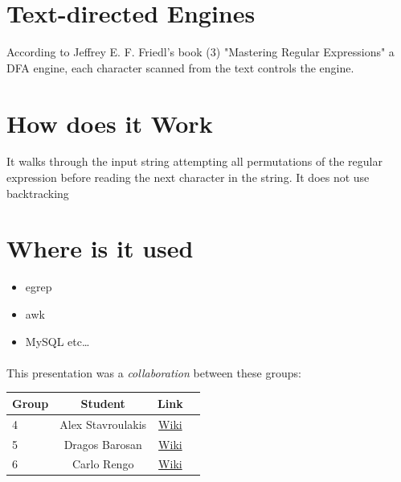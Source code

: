 \documentclass[a4paper,11pt]{report}
\begin{document}
\section{Text-directed Engines}
\begin{center}
According to Jeffrey E. F. Friedl’s book {\footnotesize (3)} "Mastering Regular Expressions" a DFA engine, each character scanned from the text controls the engine.
\end{center}

\section{How does it Work}
\begin{flushright}
It walks through the input string attempting all permutations of the regular expression before reading the next character in the string. It does not use backtracking
\end{flushright}

\section{Where is it used}
\begin{itemize}
  \item egrep
  \item awk
  \item MySQL etc\ldots
\end{itemize}

\paragraph{}
This presentation was a \emph{collaboration} between these groups: \\

\begin{center}
 \begin{tabular}{| l | c | c | c |}
 \hline \textbf{Group} & \textbf{Student} & \textbf{Link} \\
 \hline 
 4 & Alex Stavroulakis & \href{https://www.os3.nl/2014-2015/students/alexandros_stavroulakis/es}{Wiki}\\
 \hline 
 5 & Dragos Barosan & \href{https://www.os3.nl/2014-2015/students/dragos_barosan/es/week2#homework_3}{Wiki} \\ 
 \hline 
 6 & Carlo Rengo & \href{https://www.os3.nl/2014-2015/students/carlo_rengo/es/homewrk_3}{Wiki} \\ 
 \hline 
 \end{tabular} 
\end{center}
\end{document}
